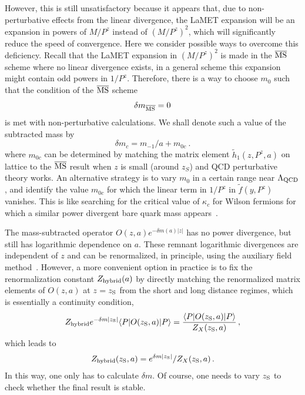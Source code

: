 \documentclass[preprint,12pt]{elsarticle}
\newcommand{\MS}{{\overline{\rm MS}}}
\begin{document}
However, this is still unsatisfactory because it appears that, due to non-perturbative
effects from the linear divergence, the LaMET expansion will be
an expansion in powers of $M/P^z$ instead of $(M/P^z)^2$, which
will significantly reduce the speed of convergence. Here
we consider possible ways to overcome this deficiency. Recall that the LaMET expansion in $(M/P^z)^2$ is
made in the $\MS$ scheme where no linear divergence exists, in a general scheme this expansion might 
contain odd powers in $1/P^z$. Therefore, there is a way to choose $m_0$
such that the condition of the $\overline{\rm  MS}$ scheme
\begin{equation}
      \delta m_{\overline{\rm MS}} = 0
\end{equation}
is met with non-perturbative calculations. 
We shall denote such a value of the subtracted mass
by \begin{equation}
\delta m_c = m_{-1}/a + m_{0c}\ .
\end{equation}
where $m_{0c}$ can be determined by matching the matrix element $\tilde h_1(z, P^z, a)$ on lattice
to the $\overline{\rm MS}$ result when $z$ is small (around $z_S$) and 
QCD perturbative theory works. An alternative strategy
is to vary $m_{0}$ in a certain range near $\Lambda_{\rm QCD}$,
and identify the value $m_{0c}$ for which the linear term in $1/P^z$ in $\tilde f(y, P^z)$ vanishes. 
This is like searching for the critical value of $\kappa_c$ for Wilson
fermions for which a similar power divergent
bare quark mass appears~\cite{Lepage:1992xa}.

The mass-subtracted operator $O(z,a)e^{-\delta m(a)|z|}$
has no power divergence, but still has logarithmic
dependence on $a$.
These remnant logarithmic divergences are independent of $z$ and can be renormalized, in principle, using the auxiliary field method~\cite{Green:2017xeu,Green:2020xco}.
However, a more convenient option in practice is to fix the renormalization constant $Z_{\rm hybrid}(a)$ by directly
matching the renormalized matrix elements of $O(z,a)$ at $z=z_{\rm S}$ from the short and long distance regimes, which is essentially a continuity condition,
\begin{align}
Z_{\rm hybrid} e^{-\delta m |z_{\rm S}|}\langle P| O(z_{\rm S},a) | P \rangle  = \frac{\langle P| O(z_{\rm S},a) | P \rangle }{Z_X(z_{\rm S},a) }\,,
\end{align}
which leads to
\begin{align}
Z_{\rm hybrid}(z_{\rm S},a) = e^{\delta m |z_{\rm S}|}/{Z_X(z_{\rm S},a)  }\,.
\end{align}
In this way, one only has to calculate $\delta m$. Of course, one needs to vary $z_{\rm S}$ to check whether the final result is stable.
\end{document}
